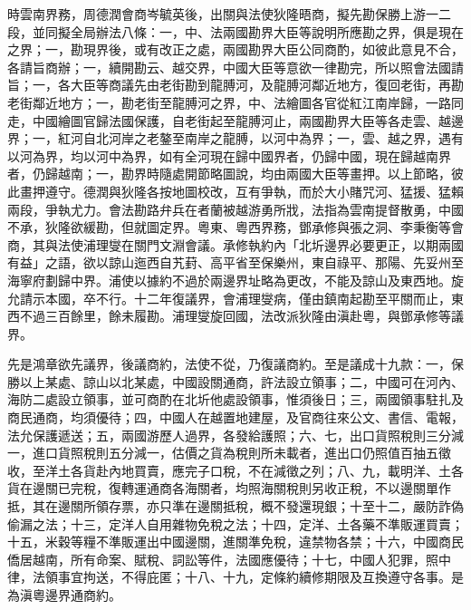 \begin{pinyinscope}
時雲南界務，周德潤會商岑毓英後，出關與法使狄隆晤商，擬先勘保勝上游一二段，並同擬全局辦法八條：一，中、法兩國勘界大臣等說明所應勘之界，俱是現在之界；一，勘現界後，或有改正之處，兩國勘界大臣公同商酌，如彼此意見不合，各請旨商辦；一，續開勘云、越交界，中國大臣等意欲一律勘完，所以照會法國請旨；一，各大臣等商議先由老街勘到龍膊河，及龍膊河鄰近地方，復回老街，再勘老街鄰近地方；一，勘老街至龍膊河之界，中、法繪圖各官從紅江南岸歸，一路同走，中國繪圖官歸法國保護，自老街起至龍膊河止，兩國勘界大臣等各走雲、越邊界；一，紅河自北河岸之老鏊至南岸之龍膊，以河中為界；一，雲、越之界，遇有以河為界，均以河中為界，如有全河現在歸中國界者，仍歸中國，現在歸越南界者，仍歸越南；一，勘界時隨處開節略圖說，均由兩國大臣等畫押。以上節略，彼此畫押遵守。德潤與狄隆各按地圖校改，互有爭執，而於大小賭咒河、猛援、猛賴兩段，爭執尤力。會法勘路弁兵在者蘭被越游勇所戕，法指為雲南提督散勇，中國不承，狄隆欲緩勘，但就圖定界。粵東、粵西界務，鄧承修與張之洞、李秉衡等會商，其與法使浦理燮在關門文淵會議。承修執約內「北圻邊界必要更正，以期兩國有益」之語，欲以諒山迤西自艽葑、高平省至保樂州，東自祿平、那陽、先妥州至海寧府劃歸中界。浦使以據約不過於兩邊界址略為更改，不能及諒山及東西地。旋允請示本國，卒不行。十二年復議界，會浦理燮病，僅由鎮南起勘至平關而止，東西不過三百餘里，餘未履勘。浦理燮旋回國，法改派狄隆由滇赴粵，與鄧承修等議界。

先是鴻章欲先議界，後議商約，法使不從，乃復議商約。至是議成十九款：一，保勝以上某處、諒山以北某處，中國設關通商，許法設立領事；二，中國可在河內、海防二處設立領事，並可商酌在北圻他處設領事，惟須後日；三，兩國領事駐扎及商民通商，均須優待；四，中國人在越置地建屋，及官商往來公文、書信、電報，法允保護遞送；五，兩國游歷人過界，各發給護照；六、七，出口貨照稅則三分減一，進口貨照稅則五分減一，估價之貨為稅則所未載者，進出口仍照值百抽五徵收，至洋土各貨赴內地買賣，應完子口稅，不在減徵之列；八、九，載明洋、土各貨在邊關已完稅，復轉運通商各海關者，均照海關稅則另收正稅，不以邊關單作抵，其在邊關所領存票，亦只準在邊關抵稅，概不發還現銀；十至十二，嚴防詐偽偷漏之法；十三，定洋人自用雜物免稅之法；十四，定洋、土各藥不準販運買賣；十五，米穀等糧不準販運出中國邊關，進關準免稅，違禁物各禁；十六，中國商民僑居越南，所有命案、賦稅、詞訟等件，法國應優待；十七，中國人犯罪，照中律，法領事宜拘送，不得庇匿；十八、十九，定條約續修期限及互換遵守各事。是為滇粵邊界通商約。


\end{pinyinscope}
